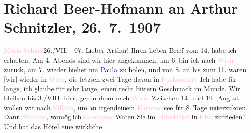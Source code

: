 

               \section[Richard Beer-Hofmann an Arthur Schnitzler, 26. 7. 1907]{ Richard Beer-Hofmann an Arthur Schnitzler,
               26. 7. 1907}\nopagebreak{}\rehead{ }\normalsize\beginnumbering{} \toendnotes[C]{\smallbreak\pagebreak[2]} 
\pstart
           \raggedleft{}{\pb}\textcolor{pink}{Maria-Schutz}{}\ledrightnote{\textcolor{pink}{Maria Schutz}}{ }26./VII.  07.\pend
           \pstart
           Lieber Arthur! Ihren lieben Brief vom 14. habe ich
               erhalten. Am 4. Abends sind wir hier angekommen, am 6. bin
               ich nach \textcolor{pink}{Wien}{}\ledrightnote{\textcolor{pink}{Wien}} zurück, am 7. wieder
               hieher um \textcolor{blue}{Paula}{}\ledrightnote{\textcolor{blue}{Paula Beer-Hofmann}} zu holen, und von 8.
               an bis zum 11. waren {[}wir{]} wieder in \textcolor{pink}{Wien}{}\ledrightnote{\textcolor{pink}{Wien}}, die letzten zwei Tage davon in \textcolor{pink}{Purkersdorf}{}\ledrightnote{\textcolor{pink}{Purkersdorf}}. Ich habe für lange, ich glaube für sehr lange,
               einen recht bittern Geschmack im Munde.\pend
           \pstart
           Wir bleiben bis 3./VIII. hier, gehen dann nach \textcolor{pink}{Wien}{}\ledrightnote{\textcolor{pink}{Wien}}. Zwischen 14. und 19. August
               wollen wir {\pb}nach \textcolor{pink}{Villach}{}\ledrightnote{\textcolor{pink}{Villach}}, um an irgendeinem \textcolor{pink}{Kärntner}{}\ledrightnote{\textcolor{pink}{Kärnten}}see für 8 Tage unterzuko{\geminationm}en. Dann \textcolor{pink}{Südtirol}{}\ledrightnote{\textcolor{pink}{Südtirol}}, womöglich \textcolor{pink}{Gardasee}{}\ledrightnote{\textcolor{pink}{Lago di Garda}}. Waren Sie im \textcolor{pink}{Lido-Hôtel}{}\ledrightnote{\textcolor{pink}{Palast Hotel Lido}} in \textcolor{pink}{Riva}{}\ledrightnote{\textcolor{pink}{Riva del Garda}} zufrieden? Und hat das Hôtel eine wirkliche
